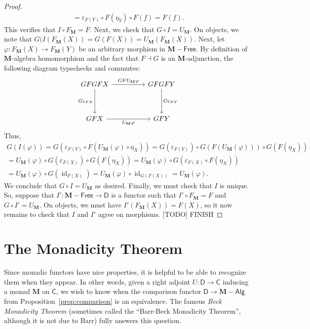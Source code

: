 \documentclass{article}
\theoremstyle{definition}
\newcommand{\C}{\mathsf{C}}
\newcommand{\D}{\mathsf{D}}
\newcommand{\M}{\mathbf{M}}
\DeclareMathOperator{\id}{id}
\newcommand{\Alg}{\mathsf{Alg}}
\newcommand{\Free}{\mathsf{Free}}
\begin{document}
\begin{proof}
\begin{multline*}
        = \varepsilon_{F(Y)} \circ F(\eta_Y) \circ F(f)
        = F(f).
    \end{multline*}
    This verifies that $I \circ F_{\M} = F$. Next, we check that $G \circ I = U_{\M}$. On objects, we note that $G(I(F_{\M}(X)) = G(F(X)) = U_{\M}(F_{\M}(X))$. Next, let $\varphi : F_{\M}(X) \to F_{\M}(Y)$ be an arbitrary morphism in $\M{-}\Free$. By definition of $\M$-algebra homomorphism and the fact that $F \dashv G$ is an $\M$-adjunction, the following diagram typechecks and commutes:
    \[\begin{tikzcd}[ampersand replacement=\&]
    	GFGFX \&\& GFGFY \\
    	\\
    	GFX \&\& GFY
    	\arrow["{GFU_{\M}\varphi}", from=1-1, to=1-3]
    	\arrow["{G\varepsilon_{FX}}"', from=1-1, to=3-1]
    	\arrow["{U_{\M}\varphi}"', from=3-1, to=3-3]
    	\arrow["{G\varepsilon_{FY}}", from=1-3, to=3-3]
    \end{tikzcd}\]
    Thus,
    \begin{multline*}
        G(I(\varphi))
        = G(\varepsilon_{F(Y)} \circ F(U_{\M}(\varphi) \circ \eta_X))
        = G(\varepsilon_{F(Y)}) \circ G(F(U_{\M}(\varphi))) \circ G(F(\eta_X))\\
        = U_{\M}(\varphi) \circ G(\varepsilon_{F(X)}) \circ G(F(\eta_X))
        = U_{\M}(\varphi) \circ G(\varepsilon_{F(X)} \circ F(\eta_X))\\
        = U_{\M}(\varphi) \circ G(\id_{F(X)})
        = U_{\M}(\varphi) \circ \id_{G(F(X))}
        = U_{\M}(\varphi).
    \end{multline*}
    We conclude that $G \circ I = U_{\M}$ as desired. Finally, we must check that $I$ is unique. So, suppose that $I' : \M{-}\Free \to \D$ is a functor such that $I' \circ F_{\M} = F$ and $G \circ I' = U_{\M}$. On objects, we must have $I'(F_{\M}(X)) = F(X)$, so it now remains to check that $I$ and $I'$ agree on morphisms.
    {\color{red}[TODO] FINISH}
\end{proof}

\section{The Monadicity Theorem}

Since monadic functors have nice properties, it is helpful to be able to recognize them when they appear. In other words, given a right adjoint $U : \D \to \C$ inducing a monad $\mathbf{M}$ on $\C$, we wish to know when the comparison functor $\D \to \mathbf{M}{-}\Alg$ from Proposition~\ref{prop:comparison} is an equivalence. The famous \emph{Beck Monadicity Theorem} (sometimes called the ``Barr-Beck Monadicity Theorem'', although it is not due to Barr) fully answers this question.
\end{document}
